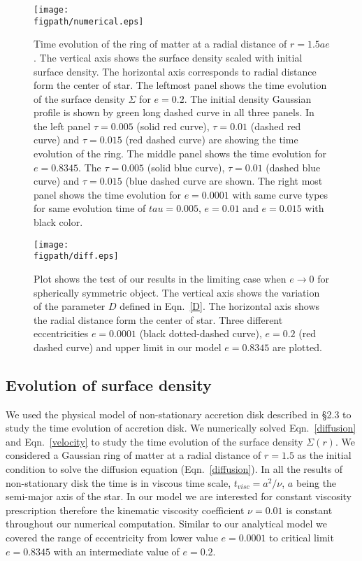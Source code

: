 \documentclass[useAMS,usenatbib]{mn2e}
\newcommand{\figpath}{./Figs/}
\begin{document}
\begin{figure*}
\centering
\texttt{[image: \\figpath/numerical.eps]}
\caption{\small{Time evolution of the ring of matter at a radial distance of $r = 1.5 ae$. The vertical axis shows the surface density scaled with initial surface density. The horizontal axis corresponds to radial distance form the center of star. The leftmost panel shows the time evolution of the surface density $\Sigma$ for $e = 0.2$. The initial density Gaussian profile is shown by green long dashed curve in all three panels. In the left panel $\tau = 0.005$ (solid red curve), $\tau = 0.01$ (dashed red curve) and $\tau = 0.015$ (red dashed curve) are showing the time evolution of the ring. The middle panel shows the time evolution for $e = 0.8345$. The $\tau = 0.005$ (solid blue curve), $\tau = 0.01$ (dashed blue curve) and $\tau = 0.015$ (blue dashed curve are shown. The right most panel shows the time evolution for $e = 0.0001$ with same curve types for same evolution time of $tau = 0.005$, $e = 0.01$ and $e = 0.015$ with black color.}}
\label{evolve}
\end{figure*}
\begin{figure}
\centering
\texttt{[image: \\figpath/diff.eps]}
\caption{\small{Plot shows the test of our results in the limiting case when $e \rightarrow 0$ for spherically symmetric object. The vertical axis shows the variation of the parameter $D$ defined in Eqn.~\ref{D}. The horizontal axis shows the radial distance form the center of star. Three different eccentricities $e = 0.0001$ (black dotted-dashed curve), $e = 0.2$ (red dashed curve) and upper limit in our model $e = 0.8345$ are plotted.}}
\label{diff}
\end{figure}
\subsection{Evolution of surface density}
We used the physical model of non-stationary accretion disk described in \S2.3 to study the time evolution of accretion disk. We numerically solved Eqn.~\ref{diffusion} and Eqn.~\ref{velocity} to study the time evolution of the surface density $\Sigma(r)$. We considered a Gaussian ring of matter at a radial distance of $r = 1.5$ as the initial condition to solve the diffusion equation (Eqn.~\ref{diffusion}). In all the results of non-stationary disk the time is in viscous time scale, $t_{visc} = a^2/\nu$, $a$ being the semi-major axis of the star. In our model we are interested for constant viscosity prescription therefore the kinematic viscosity coefficient $\nu = 0.01$ is constant throughout our numerical computation. Similar to our analytical model we covered the range of eccentricity from lower value $e = 0.0001$ to critical limit $e = 0.8345$ with an intermediate value of $e = 0.2$. 
\end{document}
